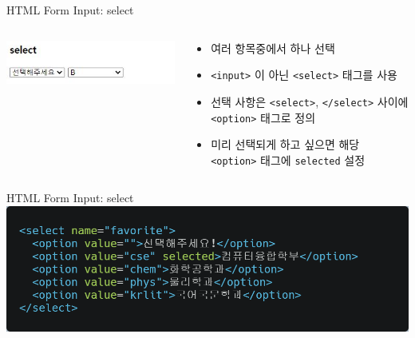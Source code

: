 \documentclass{beamer}
\begin{document}
    \begin{frame}{HTML Form Input: select}
        \begin{columns}
            \begin{column}{0.35\linewidth}
                \includegraphics[width=\linewidth]{Images/select_tag.JPG}
            \end{column}
            \begin{column}{0.65\linewidth}
                \begin{itemize}
                    \item 여러 항목중에서 하나 선택
                    \item \texttt{<input>} 이 아닌 \texttt{<select>} 태그를 사용
                    \item 선택 사항은 \texttt{<select>}, \texttt{</select>} 사이에 \texttt{<option>} 태그로 정의
                    \item 미리 선택되게 하고 싶으면 해당 \texttt{<option>} 태그에 \texttt{selected} 설정
                \end{itemize}
            \end{column}
        \end{columns}
    \end{frame}

    \begin{frame}{HTML Form Input: select}
        \includegraphics[width=\textwidth]{Images/select_sample.png}
    \end{frame}
\end{document}
